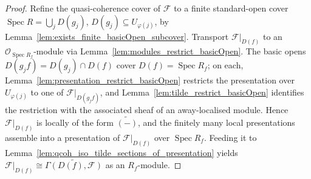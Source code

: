 \begin{proof}
  Refine the quasi-coherence cover of \(\mathcal{F}\) to a finite standard-open cover
  \(\operatorname{Spec} R = \bigcup_j D(g_j)\), \(D(g_j) \subseteq U_{\varphi(j)}\), by
  Lemma~\ref{lem:exists_finite_basicOpen_subcover}. Transport \(\mathcal{F}|_{D(f)}\) to an
  \(\mathcal{O}_{\operatorname{Spec} R_f}\)-module via
  Lemma~\ref{lem:modules_restrict_basicOpen}. The basic opens
  \(D(g_j f) = D(g_j) \cap D(f)\) cover \(D(f) = \operatorname{Spec} R_f\); on each,
  Lemma~\ref{lem:presentation_restrict_basicOpen} restricts the presentation over
  \(U_{\varphi(j)}\) to one of \(\mathcal{F}|_{D(g_j f)}\), and
  Lemma~\ref{lem:tilde_restrict_basicOpen} identifies the restriction with the associated sheaf
  of an away-localised module. Hence \(\mathcal{F}|_{D(f)}\) is locally of the form
  \(\widetilde{(-)}\), and the finitely many local presentations assemble into a presentation of
  \(\mathcal{F}|_{D(f)}\) over \(\operatorname{Spec} R_f\). Feeding it to
  Lemma~\ref{lem:qcoh_iso_tilde_sections_of_presentation} yields
  \(\mathcal{F}|_{D(f)} \cong \widetilde{\Gamma(D(f), \mathcal{F})}\) as an \(R_f\)-module.
\end{proof}

